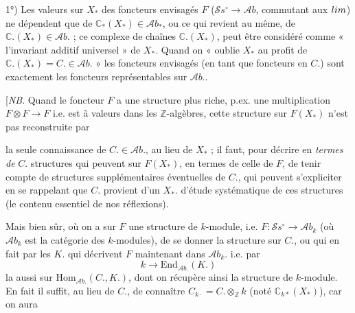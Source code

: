 \documentclass[11pt,a4paper]{article}
\begin{document}
1°) Les valeurs sur $X_{*}$ des foncteurs envisagés $F$ ($\mathcal{S}s^{\circ} \to \mathcal{A}b$,
commutant aux $\varinjlim$) ne dépendent que de 
$\mathbb{C}_{*}(X_{*}) \in \mathcal{A}b_{*}$, ou ce qui revient au même, de
$\mathbb{C}.(X_{*}) \in \mathcal{A}b.$ ; \struck{\ill{}} ce complexe de chaînes
$\mathbb{C}.(X_{*})$, peut être considéré comme « l'invariant additif universel » de
$X_{*}$. Quand on « oublie $X_{*}$ au profit de $\mathbb{C}.(X_{*}) = C. \in \mathcal{A}b.$ »
les foncteurs envisagés (en tant que foncteurs en $C.$) sont exactement les
foncteurs représentables sur $\mathcal{A}b.$.

[\emph{NB}. Quand le foncteur $F$ a une structure plus riche, p.ex. une
multiplication $F \otimes F \to F$ i.e. est à valeurs dans les $\mathbb{Z}$-algèbres,
 cette structure sur $F(X_{*})$ n'est pas reconstruite par

la seule connaissance de $C. \in \mathcal{A}b.$, au lieu de $X_{*}$ ; il faut, pour
\struck{\ill{}}  décrire en \emph{termes de} $C.$  structures  qui peuvent  sur $F(X_{*})$, en termes
de celle de $F$, de tenir compte de structures supplémentaires éventuelles de $C.$,
qui peuvent s'expliciter en se rappelant que $C.$ provient d'un $X_{*}$.
\struck{\ill{}} 
\struck{\ill{}} d'étude systématique de ces structures \struck{\ill{}}
\struck{\ill{}} (le contenu essentiel de nos réflexions).

Mais bien sûr,    où
on a sur $F$ une structure de $k$-module, i.e. $F : \mathcal{S}s^{\circ} \to \mathcal{A}b_{k}$
(où $\mathcal{A}b_{k}$ est la catégorie des $k$-modules), 
 de se donner la structure  sur
$C.$, ou \struck{\ill{}} qui en fait  par les $K.$ qui décrivent $F$ maintenant dans
$\mathcal{A}b_{k}.$ i.e. par
\[
  k \longrightarrow \mathrm{End}_{\mathcal{A}b.}(K.)
\]
la   aussi sur $\mathrm{Hom}_{\mathcal{A}b.}(C., K.)$,
dont on récupère ainsi la structure de $k$-module. En fait il suffit, au lieu de
$C.$, de connaître  $C_{k\cdot} = C. \otimes_{\mathbb{Z}} k$
(noté $\mathbb{C}_{k*}(X_{*})$), car on aura
\end{document}
